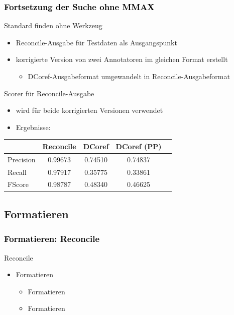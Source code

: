 \documentclass[xcolor=dvipsnames]{beamer}
\begin{document}

\begin{frame}\frametitle{\textcolor{black}{Fortsetzung der Suche ohne MMAX}}

\begin{block}{Standard finden ohne Werkzeug}
\begin{itemize}
\item Reconcile-Ausgabe für Testdaten als Ausgangspunkt
\item korrigierte Version von zwei Annotatoren im gleichen Format erstellt
\begin{itemize}
\item DCoref-Ausgabeformat umgewandelt in Reconcile-Ausgabeformat
\end{itemize}
\end{itemize}
\end{block}

\begin{block}{Scorer für Reconcile-Ausgabe}
\begin{itemize}
\item wird für beide korrigierten Versionen verwendet
\item Ergebnisse:
\end{itemize}
\begin{center}
  \begin{tabular}{ l || c | c | c ||  r }
				& Reconcile 	& DCoref 	& DCoref (PP) 	& \\ \hline \hline
    	Precision 	& 0.99673 	& 0.74510	& 0.74837		& \\ \hline
    	Recall     	& 0.97917 	& 0.35775 	& 0.33861 		& \\ \hline
    	FScore    	& 0.98787  	& 0.48340 	& 0.46625 		& \\ \hline
  \end{tabular}
\end{center}
\end{block}

\end{frame}



\subsection{Formatieren}


\begin{frame}\frametitle{\textcolor{black}{Formatieren: Reconcile}}

\begin{block}{Reconcile}
\begin{itemize}
\item Formatieren
\begin{itemize}
\item Formatieren
\item Formatieren
\end{itemize}
\end{itemize}
\end{block}

\end{frame}
\end{document}
